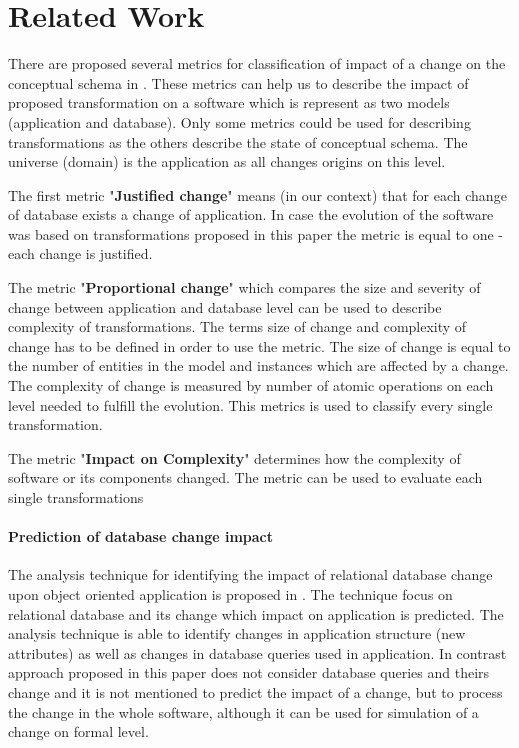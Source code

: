\documentclass[11pt]{article}
\begin{document}
\section{Related Work}
There are proposed several metrics for classification of impact of a change on the conceptual schema in \cite{Wedemeijer:ConceptualMetrics}. These metrics can help us to describe the impact of proposed transformation on a software which is represent as two models (application and database). Only some metrics could be used for describing transformations as the others describe the state of conceptual schema. The universe (domain) is the application as all changes origins on this level.

The first metric "\textbf{Justified change}" means (in our context) that for each change of database exists a change of application. In case the evolution of the software was based on transformations proposed in this paper the metric is equal to one - each change is justified.

The metric "\textbf{Proportional change}" which compares the size and severity of change between application and database level can be used to describe complexity of transformations. The terms size of change and complexity of change has to be defined in order to use the metric. The size of change is equal to the number of entities in the model and instances which are affected by a change. The complexity of change is measured by number of atomic operations on each level needed to fulfill the evolution. This metrics is used to classify every single transformation.

The metric "\textbf{Impact on Complexity}" determines how the complexity of software or its components  changed. The metric can be used to evaluate each single transformations

\paragraph{Prediction of database change impact}The analysis technique for identifying the impact of relational database change upon object oriented application is proposed in \cite{Maule:ImpactAnalysis}. The technique focus on relational database and its change which impact on application is predicted. The analysis technique is able to identify changes in application structure (new attributes) as well as changes in database queries used in application. In contrast approach proposed in this paper does not consider database queries and theirs change and it is not mentioned to predict the impact of a change, but to  
process the change in the whole software, although it can be used for simulation of a change on formal level.



\end{document}
